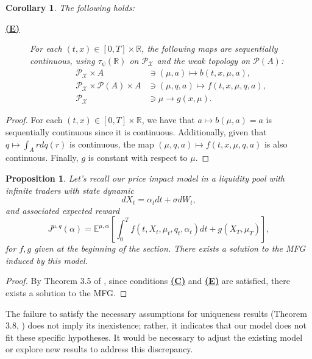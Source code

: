 \documentclass[11pt]{article}
\newtheorem{prop}[thm]{Proposition}
\newtheorem{cor}[thm]{Corollary}
\theoremstyle{definition}
\begin{document}
\begin{cor}
The following holds:
\begin{description}
  \item[\textbf{\hyperref[sup: E]{(E)}}]
  \label{sup: E}
    For each \( (t,x) \in [0,T] \times \mathbb{R} \), the following maps are sequentially continuous, using \( \tau_{\psi}(\mathbb{R}) \) on \( \mathcal{P}_\mathcal{X} \) and the weak topology on \( \mathcal{P}(A) \):
\begin{align*}
    \mathcal{P}_\mathcal{X} \times A &\ni (\mu, a) \mapsto b(t,x,\mu,a), \\
    \mathcal{P}_\mathcal{X} \times \mathcal{P}(A) \times A &\ni (\mu,q,a) \mapsto f(t,x,\mu,q,a), \\
    \mathcal{P}_\mathcal{X} &\ni \mu \to g(x,\mu).
\end{align*}
\end{description}
\end{cor}
\begin{proof} 
    For each \( (t,x) \in [0,T] \times \mathbb{R} \), we have that \( a \mapsto b(\mu, a) = a \) is sequentially continuous since it is continuous. Additionally, given that \( q \mapsto \int_A r dq(r) \) is continuous, the map \( (\mu,q,a) \mapsto f(t,x,\mu,q,a) \) is also continuous. Finally, \( g \) is constant with respect to \( \mu \).
\end{proof}
\begin{prop}
Let's recall our price impact model in a liquidity pool with infinite traders with state dynamic
$$dX_t = \alpha_t dt + \sigma dW_t,  $$
and associated expected reward
$$ J^{\mu, q}(\alpha) = \mathbb{E}^{\mu, \alpha}\left[\int_0^T f(t, X_t, \mu_t, q_t, \alpha_t) dt + g(X_T, \mu_T) \right], $$
for $f,g$ given at the beginning of the section. There exists a solution to the MFG induced by this model.
\end{prop}
\begin{proof}
    By Theorem 3.5 of \citep{carmona2015weakmfgformulation}, since conditions \textbf{\hyperref[sup: C]{(C)}} and \textbf{\hyperref[sup: E]{(E)}} are satisfied, there exists a solution to the MFG.
\end{proof}

The failure to satisfy the necessary assumptions for uniqueness results (Theorem 3.8, \citep{carmona2015weakmfgformulation}) does not imply its inexistence; rather, it indicates that our model does not fit these specific hypotheses. It would be necessary to adjust the existing model or explore new results to address this discrepancy.
\end{document}
